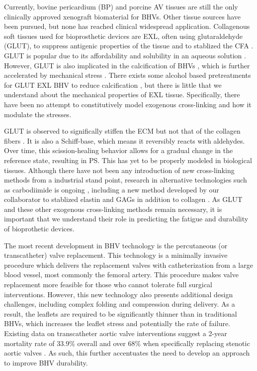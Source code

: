     
    Currently, bovine pericardium (BP) and porcine AV tissues are still the only clinically approved xenograft biomaterial for BHVs. Other tissue sources have been pursued, but none has reached clinical widespread application. Collagenous soft tissues used for bioprosthetic devices are EXL, often using glutaraldehyde (GLUT), to suppress antigenic properties of the tissue and to stablized the CFA \cite{khor_methods_1997}. GLUT is popular due to its affordability and solubility in an aqueous solution \cite{jayakrishnan_glutaraldehyde_1996}. However, GLUT is also implicated in the calcification of BHVs \cite{golomb_role_1987}, which is further accelerated by mechanical stress \cite{schoen_calcification_2005}. There exists some alcohol based pretreatments for GLUT EXL BHV to reduce calcification \cite{vyavahare_prevention_1997}, but there is little that we understand about the mechanical properties of EXL tissue. Specifically, there have been no attempt to constitutively model exogenous cross-linking and how it modulate the stresses. 
    
    
    GLUT is observed to significally stiffen the ECM but not that of the collagen fibers \cite{gentleman_mechanical_2003,yang_mechanical_2008,yang_micromechanical_2007}. It is also a Schiff-base, which means it reversibly reacts with aldehydes. Over time, this scission-healing behavior allows for a gradual change in the reference state, resulting in PS. This has yet to be properly modeled in biological tissues. Although there have not been any introduction of new cross-linking methods from a industrial stand point, research in alternative technologies such as carbodiimide is ongoing \cite{sung_crosslinking_2003,billiar_effects_2001,kemp_effects_1995}, including a new method developed by our collaborator to stablized elastin and GAGs in addition to collagen \cite{tam_novel_2015}. As GLUT and these other exogenous cross-linking methods remain necessary, it is important that we understand their role in predicting the fatigue and durability of bioprothetic devices.
    
    
    The most recent development in BHV technology is the percutaneous (or transcatheter) valve replacement. This technology is a minimally invasive procedure which delivers the replacement valves with catheterization from a large blood vessel, most commonly the femoral artery. This procedure makes valve replacement more feasible for those who cannot tolerate full surgical interventions. However, this new technology also presents additional design challenges, including complex folding and compression during delivery. As a result, the leaflets are required to be significantly thinner than in traditional BHVs, which increases the leaflet stress and potentially the rate of failure. Existing data on transcatheter aortic valve interventions suggest a 2-year mortality rate of 33.9\% overall \cite{mozaffarian_heart_2016} and over 68\% when specifically replacing stenotic aortic valves \cite{makkar_transcatheter_2012}. As such, this further accentuates the need to develop an approach to improve BHV durability. 
    
